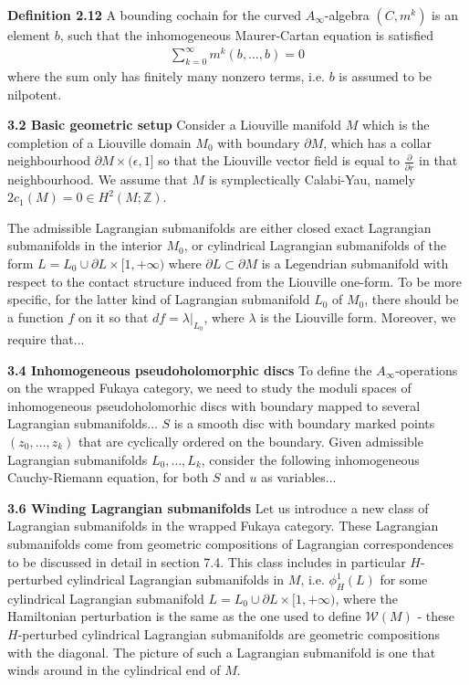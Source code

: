 \documentclass[hidelinks, 12pt]{article}
\theoremstyle{mydefstyle}
\theoremstyle{mythmstyle}
\begin{document}
\textbf{Definition 2.12} A bounding cochain for the curved $A_{\infty}$-algebra $(C, m^k)$ is an element $b$, such that the inhomogeneous Maurer-Cartan equation is satisfied
\begin{gather*}
\sum_{k = 0}^{\infty} m^k(b, \dots, b) = 0 \tag{2.34}
\end{gather*}
where the sum only has finitely many nonzero terms, i.e. $b$ is assumed to be nilpotent. 

\textbf{3.2 Basic geometric setup} Consider a Liouville manifold $M$ which is the completion of a Liouville domain $M_0$ with boundary $\partial M$, which has a collar neighbourhood $\partial M \times (\epsilon, 1]$ so that the Liouville vector field is equal to $\frac{\partial}{\partial r}$ in that neighbourhood. We assume that $M$ is symplectically Calabi-Yau, namely $2c_1(M) = 0 \in H^2(M; \mathbb{Z})$.

The admissible Lagrangian submanifolds are either closed exact Lagrangian submanifolds in the interior $M_0$, or cylindrical Lagrangian submanifolds of the form $L = L_0 \cup \partial L \times [1, +\infty)$ where $\partial L \subset \partial M$ is a Legendrian submanifold with respect to the contact structure induced from the Liouville one-form. To be more specific, for the latter kind of Lagrangian submanifold $L_0$ of $M_0$, there should be a function $f$ on it so that $df = \lambda \vert_{L_0}$, where $\lambda$ is the Liouville form. Moreover, we require that...

\textbf{3.4 Inhomogeneous pseudoholomorphic discs} To define the $A_{\infty}$-operations on the wrapped Fukaya category, we need to study the moduli spaces of inhomogeneous pseudoholomorhic discs with boundary mapped to several Lagrangian submanifolds... $S$ is a smooth disc with boundary marked points $(z_0, \dots, z_k)$ that are cyclically ordered on the boundary. Given admissible Lagrangian submanifolds $L_0, \dots, L_k$, consider the following inhomogeneous Cauchy-Riemann equation, for both $S$ and $u$ as variables...

\textbf{3.6 Winding Lagrangian submanifolds} Let us introduce a new class of Lagrangian submanifolds in the wrapped Fukaya category. These Lagrangian submanifolds come from geometric compositions of Lagrangian correspondences to be discussed in detail in section 7.4. This class includes in particular $H$-perturbed cylindrical Lagrangian submanifolds in $M$, i.e. $\phi^1_H(L)$ for some cylindrical Lagrangian submanifold $L = L_0 \cup \partial L \times [1, +\infty)$, where the Hamiltonian perturbation is the same as the one used to define $\mathcal{W}(M)$ - these $H$-perturbed cylindrical Lagrangian submanifolds are geometric compositions with the diagonal. The picture of such a Lagrangian submanifold is one that winds around in the cylindrical end of $M$. 
\end{document}
